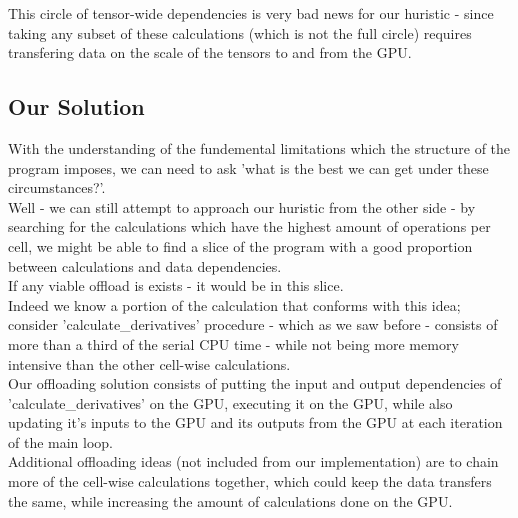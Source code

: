 This circle of tensor-wide dependencies is very bad news for our huristic -
since taking any subset of these calculations (which is not the full circle)
requires transfering data on the scale of the tensors to and from the GPU.\\

\subsection*{Our Solution}
With the understanding of the fundemental limitations 
which the structure of the program imposes,
we can need to ask 'what is the best we can get under these circumstances?'.\\
Well - we can still attempt to approach our huristic
from the other side - by searching for the calculations 
which have the highest amount of operations per cell,
we might be able to find a slice of the program
with a good proportion between calculations and data dependencies.\\
If any viable offload is exists - it would be in this slice.\\

Indeed we know a portion of the calculation that conforms with this idea;
consider 'calculate\_derivatives' procedure - which as we saw before -
consists of more than a third of the serial CPU time - while not being more memory
intensive than the other cell-wise calculations.\\
Our offloading solution consists of putting the input and
output dependencies of 'calculate\_derivatives' on the GPU,
executing it on the GPU, while also updating it's inputs to the GPU and
its outputs from the GPU at each iteration of the main loop.\\

Additional offloading ideas (not included from our implementation) 
are to chain more of the cell-wise calculations together,
which could keep the data transfers the same, while increasing the
amount of calculations done on the GPU.\\